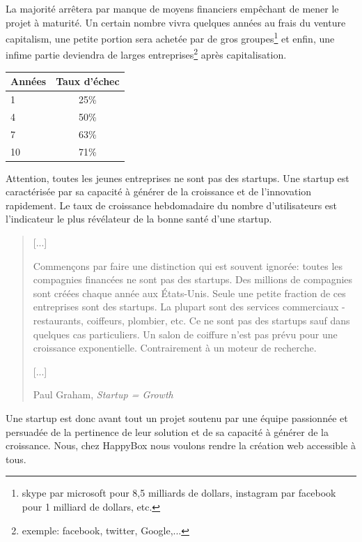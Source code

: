 \documentclass[11pt, a4paper ]{article}
\begin{document}
\begin{spacing}{1.5}
La majorité arrêtera par manque de moyens financiers empêchant de mener le projet à maturité. Un certain nombre vivra quelques années au frais du venture capitalism, une petite portion sera achetée par de gros groupes\footnote{skype par microsoft pour 8,5 milliards de dollars, instagram par facebook pour 1 milliard de dollars, etc.} et enfin, une infime partie deviendra de larges entreprises\footnote{exemple: facebook, twitter, Google,...} après capitalisation.

\begin{center}
	\begin{tabular}{l*{1}{c}}
		Années  & Taux d'échec\\
		\hline
		1 & 25\% \\
		4 & 50\% \\
		7 & 63\% \\
		10 & 71\% \\
	\end{tabular}\cite{statEchecStartup}
\end{center}

Attention, toutes les jeunes entreprises ne sont pas des startups. Une startup est caractérisée par sa capacité à générer de la croissance et de l'innovation rapidement. Le taux de croissance hebdomadaire du nombre d'utilisateurs est l'indicateur le plus révélateur de la bonne santé d'une startup.

\begin{quote}
	[...]

	Commençons par faire une distinction qui est souvent ignorée: toutes les compagnies financées ne sont pas des startups. Des millions de compagnies sont créées chaque année aux États-Unis. Seule une petite fraction de ces entreprises sont des startups. La plupart sont des services commerciaux - restaurants, coiffeurs, plombier, etc. Ce ne sont pas des startups sauf dans quelques cas particuliers. Un salon de coiffure n'est pas prévu pour une croissance exponentielle. Contrairement à un moteur de recherche.

	[...]


	\caption{Paul Graham, \emph{Startup = Growth\cite{startupGrowth}}}
\end{quote}

Une startup est donc avant tout un projet soutenu par une équipe passionnée et persuadée de la pertinence de leur solution et de sa capacité à générer de la croissance. Nous, chez HappyBox nous voulons rendre la création web accessible à tous.


\end{spacing}
\end{document}
